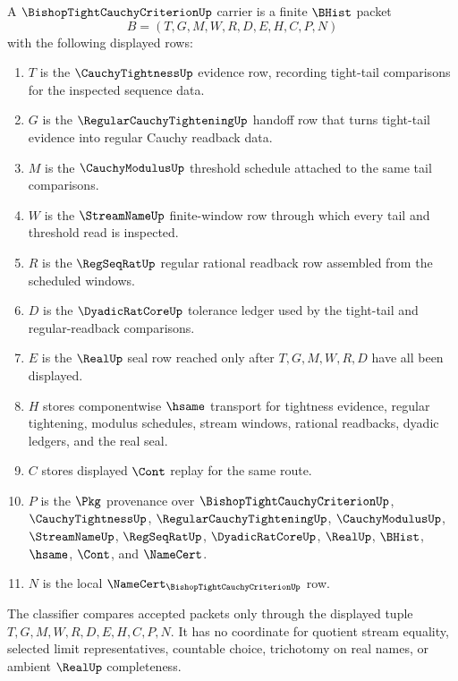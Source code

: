 \begin{definition}
\label{def:bishop-tight-cauchy-criterion-carrier}
A $\BishopTightCauchyCriterionUp$ carrier is a finite $\BHist$ packet
$$
B=(T,G,M,W,R,D,E,H,C,P,N)
$$
with the following displayed rows:
\begin{enumerate}
\item $T$ is the $\CauchyTightnessUp$ evidence row, recording tight-tail comparisons for the inspected sequence data.
\item $G$ is the $\RegularCauchyTighteningUp$ handoff row that turns tight-tail evidence into regular Cauchy readback data.
\item $M$ is the $\CauchyModulusUp$ threshold schedule attached to the same tail comparisons.
\item $W$ is the $\StreamNameUp$ finite-window row through which every tail and threshold read is inspected.
\item $R$ is the $\RegSeqRatUp$ regular rational readback row assembled from the scheduled windows.
\item $D$ is the $\DyadicRatCoreUp$ tolerance ledger used by the tight-tail and regular-readback comparisons.
\item $E$ is the $\RealUp$ seal row reached only after $T,G,M,W,R,D$ have all been displayed.
\item $H$ stores componentwise $\hsame$ transport for tightness evidence, regular tightening, modulus schedules, stream windows, rational readbacks, dyadic ledgers, and the real seal.
\item $C$ stores displayed $\Cont$ replay for the same route.
\item $P$ is the $\Pkg$ provenance over $\BishopTightCauchyCriterionUp$, $\CauchyTightnessUp$, $\RegularCauchyTighteningUp$, $\CauchyModulusUp$, $\StreamNameUp$, $\RegSeqRatUp$, $\DyadicRatCoreUp$, $\RealUp$, $\BHist$, $\hsame$, $\Cont$, and $\NameCert$.
\item $N$ is the local $\NameCert_{\BishopTightCauchyCriterionUp}$ row.
\end{enumerate}
The classifier compares accepted packets only through the displayed tuple $T,G,M,W,R,D,E,H,C,P,N$. It has no coordinate for quotient stream equality, selected limit representatives, countable choice, trichotomy on real names, or ambient $\RealUp$ completeness.
\end{definition}

